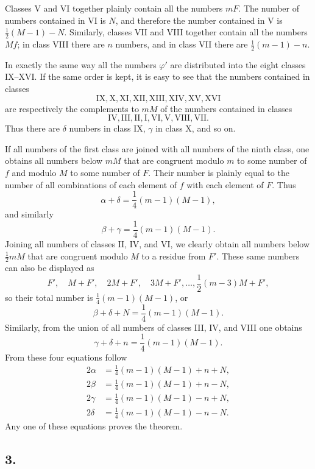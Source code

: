 \documentclass[12pt]{article}
\begin{document}
Classes V and VI together plainly contain all the numbers $mF$. The number of numbers contained in VI is $N$, and therefore the number contained in V is $\frac12(M-1)-N$. Similarly, classes VII and VIII together contain all the numbers $Mf$; in class VIII there are $n$ numbers, and in class VII there are $\frac12(m-1)-n$.

In exactly the same way all the numbers $\varphi'$ are distributed into the eight classes IX--XVI. If the same order is kept, it is easy to see that the numbers contained in classes
\[
\mathrm{IX},\mathrm{X},\mathrm{XI},\mathrm{XII},\mathrm{XIII},\mathrm{XIV},\mathrm{XV},\mathrm{XVI}
\]
are respectively the complements to $mM$ of the numbers contained in classes
\[
\mathrm{IV},\mathrm{III},\mathrm{II},\mathrm{I},\mathrm{VI},\mathrm{V},\mathrm{VIII},\mathrm{VII}.
\]
Thus there are $\delta$ numbers in class IX, $\gamma$ in class X, and so on.

If all numbers of the first class are joined with all numbers of the ninth class, one obtains all numbers below $mM$ that are congruent modulo $m$ to some number of $f$ and modulo $M$ to some number of $F$. Their number is plainly equal to the number of all combinations of each element of $f$ with each element of $F$. Thus
\[
\alpha+\delta=\frac14(m-1)(M-1),
\]
and similarly
\[
\beta+\gamma=\frac14(m-1)(M-1).
\]
Joining all numbers of classes II, IV, and VI, we clearly obtain all numbers below $\frac12mM$ that are congruent modulo $M$ to a residue from $F'$. These same numbers can also be displayed as
\[
F',\quad M+F',\quad 2M+F',\quad 3M+F',\ldots,\frac12(m-3)M+F',
\]
so their total number is $\frac14(m-1)(M-1)$, or
\[
\beta+\delta+N=\frac14(m-1)(M-1).
\]
Similarly, from the union of all numbers of classes III, IV, and VIII one obtains
\[
\gamma+\delta+n=\frac14(m-1)(M-1).
\]
From these four equations follow
\[
\begin{aligned}
2\alpha&=\frac14(m-1)(M-1)+n+N,\\
2\beta&=\frac14(m-1)(M-1)+n-N,\\
2\gamma&=\frac14(m-1)(M-1)-n+N,\\
2\delta&=\frac14(m-1)(M-1)-n-N.
\end{aligned}
\]
Any one of these equations proves the theorem.

\subsection*{3.}
\end{document}
